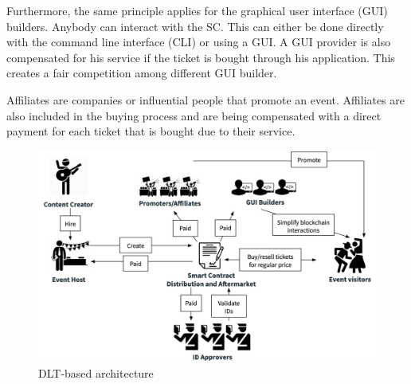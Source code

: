 Furthermore, the same principle applies for the graphical user interface (GUI) builders. Anybody can interact with the SC. This can either be done directly with the command line interface (CLI) or using a GUI. A GUI provider is also compensated for his service if the ticket is bought through his application. This creates a fair competition among different GUI builder.

Affiliates are companies or influential people that promote an event. Affiliates are also included in the buying process and are being compensated with a direct payment for each ticket that is bought due to their service. 


\begin{figure}[H]
    \centering
    \includegraphics[width=16cm]{figures/dlt-based-landscape.png}
    \caption{DLT-based architecture}
    \label{fig:dlt-based-landscape}
\end{figure}

